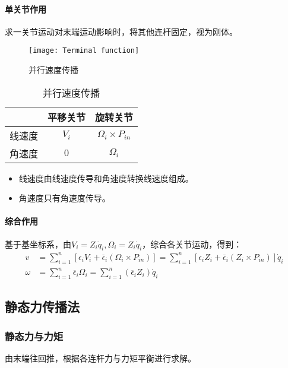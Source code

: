 \documentclass[
12pt, %
a4paper, 
oneside, %
headinclude,footinclude, %
]{scrartcl}
\begin{document}
\paragraph{单关节作用}\label{sec:bingxing}
求一关节运动对末端运动影响时，将其他连杆固定，视为刚体。
\begin{figure}[H]
\centering 
\texttt{[image: Terminal function]} 
\caption[并行速度传播]{并行速度传播}
\end{figure}

\begin{table}[H]
\centering
\begin{tabular}{c|cc}
\hline
& 平移关节 & 旋转关节 \\
\hline
线速度 & $ V_i $ & $ \Omega_i \times P_{in} $ \\
角速度 & $ 0 $ & $ \Omega_i $ \\
\hline
\end{tabular}
\caption{并行速度传播}
\end{table}

\begin{itemize}
\item 线速度由线速度传导和角速度转换线速度组成。
\item 角速度只有角速度传导。
\end{itemize} 
\paragraph{综合作用}
基于基坐标系，由$ V_i = Z_i \dot{q}_i, \Omega_i = Z_i \dot{q}_i $，综合各关节运动，得到：
\begin{align*}
v &= \sum_{i = 1}^n [\epsilon_i V_i + \overline{\epsilon}_i (\Omega_i \times P_{in})] = \sum_{i = 1}^n [\epsilon_i Z_i + \overline{\epsilon}_i (Z_i \times P_{in})] \dot{q}_i \\
\omega &= \sum_{i = 1}^n \overline{\epsilon}_i \Omega_i = \sum_{i = 1}^n (\overline{\epsilon}_i Z_i) \dot{q}_i
\end{align*}
\subsection{静态力传播法}
\subsubsection{静态力与力矩}\label{sec:fn1}
由末端往回推，根据各连杆力与力矩平衡进行求解。
\end{document}
